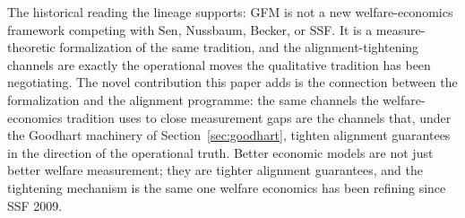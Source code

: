 \begin{table}[ht]
\caption{The capability-economics lineage mapped onto GFM
quantifications and the four channels of
Sections~\ref{sec:channel_observation}--\ref{sec:channel_bundles}.
The SSF~2009 row also flags the diagnostic-decomposition role:
the five-cell $\delta$-attribution acts as a deployment-readable
selector for which channel binds, mirroring the role the SSF
decomposition plays in welfare-economics measurement
methodology.  The Arrow~1951 row is structural rather than
channel-bound: GFM appears to sidestep the impossibility by
being a measure on a poset rather than a ranking aggregator,
but whether an analogous impossibility result applies to
measure-aggregation on posets is open
(Open~Question~\ref{oq:arrow}).}
\label{tab:lineage_mapping}
\end{table}

The historical reading the lineage supports: GFM is not a new
welfare-economics framework competing with Sen, Nussbaum, Becker,
or SSF.  It is a measure-theoretic formalization of the same
tradition, and the alignment-tightening channels are exactly the
operational moves the qualitative tradition has been negotiating.
The novel contribution this paper adds is the connection between
the formalization and the alignment programme: the same channels
the welfare-economics tradition uses to close measurement gaps are
the channels that, under the Goodhart machinery of
Section~\ref{sec:goodhart}, tighten alignment guarantees in the
direction of the operational truth.  Better economic models are
not just better welfare measurement; they are tighter alignment
guarantees, and the tightening mechanism is the same one welfare
economics has been refining since SSF 2009.
